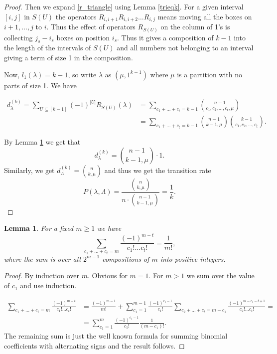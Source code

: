 \documentclass[11pt]{amsart}
\newtheorem{lemma}[theorem]{Lemma}
\begin{document}
\begin{proof}
Then we expand \eqref{r_triangle} using Lemma \ref{trieqk}. For a given interval $[i,j]$ in $S(U)$ the operators $R_{i,i+1}R_{i,i+2}\dots R_{i,j}$ means moving all the boxes on $i+1,\dots,j$ to $i$. Thus the effect of operators $R_{S(U)}$ on the column of 1's is collecting $j_s-i_s$ boxes on position $i_s$. Thus it gives a composition of $k-1$ into the length of the intervals of $S(U)$ and all numbers not 
belonging to an interval giving a term of size 1 in the composition.

Now, $l_1(\lambda)=k-1$, so write $\lambda$ as $\left(\mu,1^{k-1}\right)$ where $\mu$ is a partition with no parts of size 1. We have

\begin{equation*}
\begin{split}
d_{\lambda}^{(k)}=\sum_{U\subseteq [k-1]} (-1)^{|U|} R_{S(U)}(\lambda)&=\sum_{c_1+\dots+c_t=k-1} \binom{n-1}{c_1,c_2,\dots,c_t,\mu}\\
&=
\sum_{c_1+\dots+c_t=k-1} \binom{n-1}{k-1,\mu}\binom{k-1}{c_1,c_2,\dots,c_t}.
\end{split}
\end{equation*}

\[\]
By Lemma \ref{lem:comp} we get that
\[d_{\lambda}^{(k)}= \binom{n-1}{k-1,\mu}\cdot 1.\]
Similarly, we get $d_{\Lambda}^{(k)}= \binom{n}{k,\mu}$ and thus we get the transition rate
\[
P(\lambda,\Lambda)=\frac{\binom{n}{k,\mu}}{n\cdot \binom{n-1}{k-1,\mu}}=\frac{1}{k}.
\]
\end{proof}
\begin{lemma}\label{lem:comp} For a fixed $m\ge 1$ we have
 \[   \sum_{c_1+\dots+c_t=m} \frac{(-1)^{m-t}}{c_1!\dots c_t!}=\frac{1}{m!},
\]
where the sum is over all $2^{m-1}$ compositions of $m$ into positive integers.
\end{lemma}
\begin{proof}
    By induction over $m$. Obvious for $m=1$. For $m>1$ we sum over the value of $c_1$ and use induction.

 \begin{align*}
 \sum_{c_1+\dots+c_t=m} \frac{(-1)^{m-t}}{c_1!\dots c_t!}
 &=\frac{(-1)^{m-1}}{m!}+\sum_{c_1=1}^{m-1}\frac{(-1)^{c_1-1}}{c_1!}\sum_{c_2+\dots+c_t=m-c_1} \frac{(-1)^{m-c_1-t+1}}{c_2!\dots c_t!}=\\
 &=\sum_{c_1=1}^{m}\frac{(-1)^{c_1-1}}{c_1!}\frac{1}{(m-c_1)!}.
 \end{align*}
 The remaining sum is just the well known formula for summing binomial coefficients with alternating signs and the result follows.
\end{proof}
\end{document}
